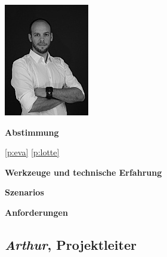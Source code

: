 \begin{multicols}{2}

\begin{center}
\includegraphics[width=0.5\columnwidth]{media/jan.jpg}
\end{center}


\textbf{Abstimmung}

\ref{p:eva}
\ref{p:lotte}

\textbf{Werkzeuge und technische Erfahrung}

\columnbreak

\textbf{Szenarios}

\textbf{Anforderungen}

\end{multicols}

\pagebreak

\subsection{\emph{Arthur}, Projektleiter}\label{p:arthur}

